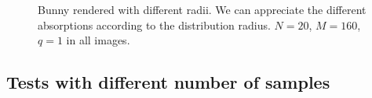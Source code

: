 \begin{figure}[h]
\centering
{}
\caption{Bunny rendered with different radii. We can appreciate the different absorptions according to the distribution radius. $N = 20$, $M = 160$, $q = 1$ in all images.}
\label{fig:Bunnytr}
\end{figure}

\subsection{Tests with different number of samples}


